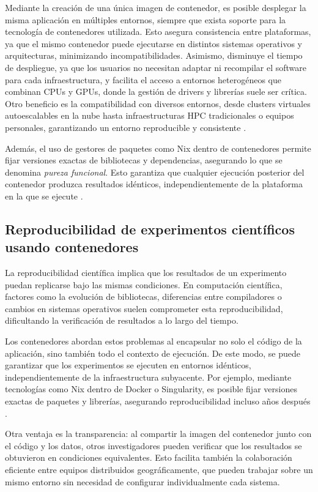Mediante la creación de una única imagen de contenedor, es posible desplegar la misma aplicación en múltiples entornos, siempre que exista soporte para la tecnología de contenedores utilizada. Esto asegura consistencia entre plataformas, ya que el mismo contenedor puede ejecutarse en distintos sistemas operativos y arquitecturas, minimizando incompatibilidades. Asimismo, disminuye el tiempo de despliegue, ya que los usuarios no necesitan adaptar ni recompilar el software para cada infraestructura, y facilita el acceso a entornos heterogéneos que combinan CPUs y GPUs, donde la gestión de drivers y librerías suele ser crítica. Otro beneficio es la compatibilidad con diversos entornos, desde clusters virtuales autoescalables en la nube hasta infraestructuras \acs{HPC} tradicionales o equipos personales, garantizando un entorno reproducible y consistente \cite{Vaillancourt2020SelfScalingCA}.

Además, el uso de gestores de paquetes como Nix dentro de contenedores permite fijar versiones exactas de bibliotecas y dependencias, asegurando lo que se denomina \textit{pureza funcional}. Esto garantiza que cualquier ejecución posterior del contenedor produzca resultados idénticos, independientemente de la plataforma en la que se ejecute \cite{Vaillancourt2020SelfScalingCA}.

\subsection{Reproducibilidad de experimentos científicos usando contenedores}

La reproducibilidad científica implica que los resultados de un experimento puedan replicarse bajo las mismas condiciones. En computación científica, factores como la evolución de bibliotecas, diferencias entre compiladores o cambios en sistemas operativos suelen comprometer esta reproducibilidad, dificultando la verificación de resultados a lo largo del tiempo.

Los contenedores abordan estos problemas al encapsular no solo el código de la aplicación, sino también todo el contexto de ejecución. De este modo, se puede garantizar que los experimentos se ejecuten en entornos idénticos, independientemente de la infraestructura subyacente. Por ejemplo, mediante tecnologías como Nix dentro de Docker o Singularity, es posible fijar versiones exactas de paquetes y librerías, asegurando reproducibilidad incluso años después \cite{Vaillancourt2020SelfScalingCA}.

Otra ventaja es la transparencia: al compartir la imagen del contenedor junto con el código y los datos, otros investigadores pueden verificar que los resultados se obtuvieron en condiciones equivalentes. Esto facilita también la colaboración eficiente entre equipos distribuidos geográficamente, que pueden trabajar sobre un mismo entorno sin necesidad de configurar individualmente cada sistema.

